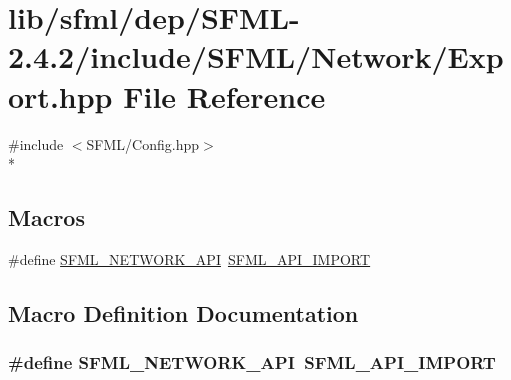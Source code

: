 \hypertarget{sfml_2dep_2_s_f_m_l-2_84_82_2include_2_s_f_m_l_2_network_2_export_8hpp}{\section{lib/sfml/dep/\-S\-F\-M\-L-\/2.4.2/include/\-S\-F\-M\-L/\-Network/\-Export.hpp File Reference}
\label{sfml_2dep_2_s_f_m_l-2_84_82_2include_2_s_f_m_l_2_network_2_export_8hpp}
}
{\ttfamily \#include $<$S\-F\-M\-L/\-Config.\-hpp$>$}\\*
\subsection*{Macros}
\begin{DoxyCompactItemize}
\item 
\#define \hyperlink{sfml_2dep_2_s_f_m_l-2_84_82_2include_2_s_f_m_l_2_network_2_export_8hpp_ac5d46d4ffd98e947e28c54d051b338e7}{S\-F\-M\-L\-\_\-\-N\-E\-T\-W\-O\-R\-K\-\_\-\-A\-P\-I}~\hyperlink{sfml_2dep_2_s_f_m_l-2_84_82_2include_2_s_f_m_l_2_config_8hpp_aba0bbe5791bee6633caa835c7f6a12a4}{S\-F\-M\-L\-\_\-\-A\-P\-I\-\_\-\-I\-M\-P\-O\-R\-T}
\end{DoxyCompactItemize}


\subsection{Macro Definition Documentation}
\hypertarget{sfml_2dep_2_s_f_m_l-2_84_82_2include_2_s_f_m_l_2_network_2_export_8hpp_ac5d46d4ffd98e947e28c54d051b338e7}{
\subsubsection[{S\-F\-M\-L\-\_\-\-N\-E\-T\-W\-O\-R\-K\-\_\-\-A\-P\-I}]{\setlength{\rightskip}{0pt plus 5cm}\#define S\-F\-M\-L\-\_\-\-N\-E\-T\-W\-O\-R\-K\-\_\-\-A\-P\-I~{\bf S\-F\-M\-L\-\_\-\-A\-P\-I\-\_\-\-I\-M\-P\-O\-R\-T}}}\label{sfml_2dep_2_s_f_m_l-2_84_82_2include_2_s_f_m_l_2_network_2_export_8hpp_ac5d46d4ffd98e947e28c54d051b338e7}
